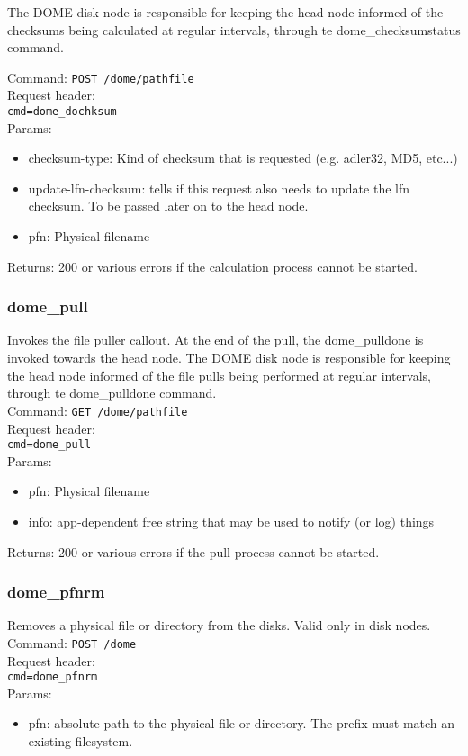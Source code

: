 \documentclass[a4paper,10pt]{scrreprt}
\begin{document}
 The DOME disk node is responsible for keeping the head node
 informed of the checksums being calculated at regular intervals,
 through te dome\_checksumstatus command.

 Command:
\lstinline"POST /dome/pathfile"\\
Request header:\\
\lstinline"cmd=dome_dochksum"\\
Params:
\begin{itemize}
 \item checksum-type: Kind of checksum that is requested (e.g. adler32, MD5, etc...)
 \item update-lfn-checksum: tells if this request also needs to update the lfn checksum. To be passed later on to the head node.
 \item pfn: Physical filename
\end{itemize}

Returns: 200 or various errors if the calculation process cannot be started.


\subsubsection{dome\_pull}
 Invokes the file puller callout. At the end of the pull, the dome\_pulldone is invoked towards the head node.
 The DOME disk node is responsible for keeping the head node
 informed of the file pulls being performed at regular intervals,
 through te dome\_pulldone command.\\
 
 
 
Command:
\lstinline"GET /dome/pathfile"\\
Request header:\\
\lstinline"cmd=dome_pull"\\
Params:
\begin{itemize}
 \item pfn: Physical filename
 \item info: app-dependent free string that may be used to notify (or log) things
\end{itemize}

Returns: 200 or various errors if the pull process cannot be started.

 
\subsubsection{dome\_pfnrm}

Removes a physical file or directory from the disks. Valid only in disk nodes.\\
Command:
\lstinline"POST /dome"\\
Request header:\\
\lstinline"cmd=dome_pfnrm"\\
Params:
\begin{itemize}
 \item pfn: absolute path to the physical file or directory. The prefix must match an existing filesystem.
\end{itemize}
\end{document}
